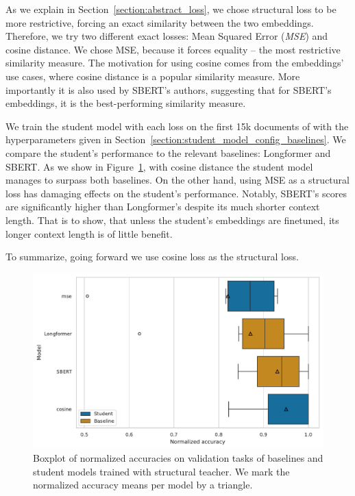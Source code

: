 As we explain in Section~\ref{section:abstract_loss}, we chose structural loss
to be more restrictive, forcing an exact similarity between the two embeddings.
Therefore, we try two different exact losses: Mean Squared Error (\emph{MSE})
and cosine distance. We chose MSE, because it forces equality -- the most
restrictive similarity measure. The motivation for using cosine comes from the
embeddings' use cases, where cosine distance is a popular similarity measure.
More importantly it is also used by SBERT's authors, suggesting that for
SBERT's embeddings, it is the best-performing similarity measure.

We train the student model with each loss on the first 15k documents of
 with the hyperparameters given in
Section~\ref{section:student_model_config_baselines}. We compare the student's
performance to the relevant baselines: Longformer and SBERT. As we show in
Figure~\ref{fig:structural_basic}, with cosine distance the student model
manages to surpass both baselines. On the other hand, using MSE as a structural
loss has damaging effects on the student's performance. Notably, SBERT's scores
are significantly higher than Longformer's despite its much shorter context
length. That is to show, that unless the student's embeddings are finetuned,
its longer context length is of little benefit.


To summarize, going forward we
use cosine loss as the structural loss.

\begin{figure}
  \includegraphics[width=\textwidth]{img/structural_simple_losses.pdf}

  \caption{Boxplot of normalized accuracies on validation tasks of baselines
  and student models trained with structural teacher. We mark the normalized
  accuracy means per model by a triangle.}

  \label{fig:structural_basic}
\end{figure}

